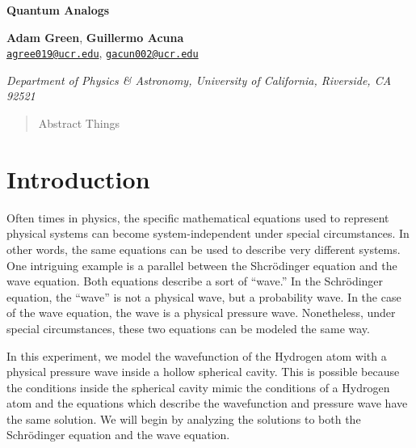 \documentclass[12pt]{article}
\newcommand{\email}[1]{\href{mailto:#1}{#1}}
\newenvironment{institutions}[1][2em]{\begin{list}{}{\setlength\leftmargin{#1}\setlength\rightmargin{#1}}\item[]}{\end{list}}
\begin{document}
	
\begin{center}

	{\huge \bf Quantum Analogs}
	
	\vspace{0.5cm}
	
	\textbf{Adam Green}, \textbf{Guillermo Acuna}\\
	
	\texttt{\footnotesize \email{agree019@ucr.edu}},
	\texttt{\footnotesize \email{gacun002@ucr.edu}}
	
	\vspace{0.5cm}
	
	
	\begin{institutions}[2.25cm]
		\footnotesize
		{\it 
			Department of Physics \& Astronomy, 
			University of  California, Riverside, 
			{CA} 92521	    
		}    
	\end{institutions}

	\vspace{0.5cm}
	
\end{center}

	\vspace{0.5cm}

\begin{abstract}
Abstract Things	
\end{abstract}
	
	\section{Introduction}
	Often times in physics, the specific mathematical equations used to represent physical systems can become system-independent under special circumstances. In other words, the same equations can be used to describe very different systems. One intriguing example is a parallel between the Shcr\"odinger equation and the wave equation. Both equations describe a sort of ``wave.'' In the Schr\"odinger equation, the ``wave'' is not a physical wave, but a probability wave. In the case of the wave equation, the wave is a physical pressure wave. Nonetheless, under special circumstances, these two equations can be modeled the same way.
	
	In this experiment, we model the wavefunction of the Hydrogen atom with a physical pressure wave inside a hollow spherical cavity. This is possible because the conditions inside the spherical cavity mimic the conditions of a Hydrogen atom and the equations which describe the wavefunction and pressure wave have the same solution. We will begin by analyzing the solutions to both the Schr\"odinger equation and the wave equation.
\end{document}
